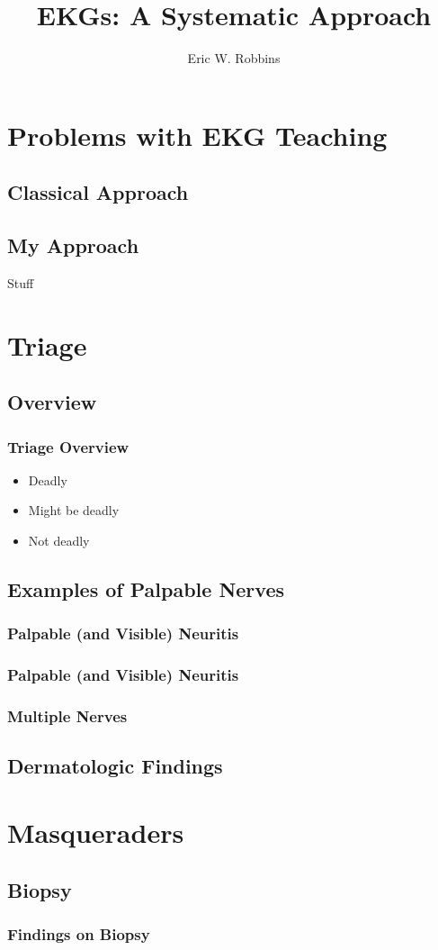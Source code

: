 \documentclass{beamer}
\title{EKGs: A Systematic Approach}
\author{Eric W. Robbins}
\date{}
\begin{document}
	\begin{frame}
		\maketitle
	\end{frame}
	\begin{frame}
		\tableofcontents
	\end{frame}
\section{Problems with EKG Teaching}
\subsection{Classical Approach}
\subsection{My Approach}
	\begin{frame}
		Stuff
	\end{frame}
\section{Triage}
\subsection{Overview}
	\begin{frame}
		\frametitle{Triage Overview}
			\begin{itemize}
				\item Deadly
				\item Might be deadly
				\item Not deadly
			\end{itemize}
	\end{frame}
\subsection{Examples of Palpable Nerves}
	\begin{frame}
		\frametitle{Palpable (and Visible) Neuritis}
	\end{frame}
	\begin{frame}
		\frametitle{Palpable (and Visible) Neuritis}
	\end{frame}
	\begin{frame}
		\frametitle{Multiple Nerves}
	\end{frame}       
	\begin{frame}
	\end{frame}
	\begin{frame}
	\end{frame}
\subsection{Dermatologic Findings}
	\begin{frame}
	\end{frame}
\section{Masqueraders}
\subsection{Biopsy}
	\begin{frame}
		\frametitle{Findings on Biopsy}
	\end{frame}
\end{document}
